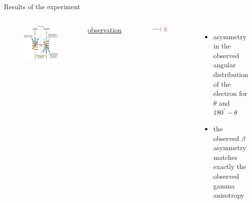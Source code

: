 \documentclass[aspectratio=1610, 10pt]{beamer}
\begin{document}
\begin{frame}{Results of the experiment}
\begin{columns}
\begin{figure}
			\includegraphics[width=\textwidth]{images/Wu_experiment.jpg}
		\end{figure}
		\underline{observation}
		\begin{figure}
			\includegraphics[width=0.8\textwidth]{images/Co_violation.png}
		\end{figure}
		\begin{itemize}
			\item asymmetry in the observed angular distribution of the electron for $\theta$ and $180^° -\theta$
			\item the observed $\beta$ asymmetry matches exactly the observed gamma anisotropy
		\end{itemize}
	\end{columns}
\end{frame}
\end{document}
